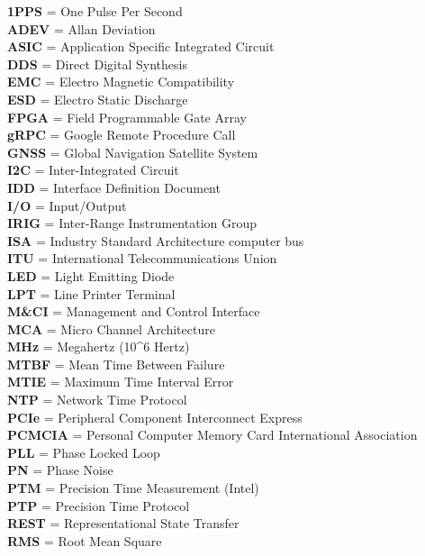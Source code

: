 \documentclass[
]{article}
\begin{document}
\textbf{1PPS} = One Pulse Per Second\\
\textbf{ADEV} = Allan Deviation\\
\textbf{ASIC} = Application Specific Integrated Circuit\\
\textbf{DDS} = Direct Digital Synthesis\\
\textbf{EMC} = Electro Magnetic Compatibility\\
\textbf{ESD} = Electro Static Discharge\\
\textbf{FPGA} = Field Programmable Gate Array\\
\textbf{gRPC} = Google Remote Procedure Call\\
\textbf{GNSS} = Global Navigation Satellite System\\
\textbf{I2C} = Inter-Integrated Circuit\\
\textbf{IDD} = Interface Definition Document\\
\textbf{I/O} = Input/Output\\
\textbf{IRIG} = Inter-Range Instrumentation Group\\
\textbf{ISA} = Industry Standard Architecture computer bus\\
\textbf{ITU} = International Telecommunications Union\\
\textbf{LED} = Light Emitting Diode\\
\textbf{LPT} = Line Printer Terminal\\
\textbf{M\&CI} = Management and Control Interface\\
\textbf{MCA} = Micro Channel Architecture\\
\textbf{MHz} = Megahertz (10\^{}6 Hertz)\\
\textbf{MTBF} = Mean Time Between Failure\\
\textbf{MTIE} = Maximum Time Interval Error\\
\textbf{NTP} = Network Time Protocol\\
\textbf{PCIe} = Peripheral Component Interconnect Express\\
\textbf{PCMCIA} = Personal Computer Memory Card International
Association\\
\textbf{PLL} = Phase Locked Loop\\
\textbf{PN} = Phase Noise\\
\textbf{PTM} = Precision Time Measurement (Intel)\\
\textbf{PTP} = Precision Time Protocol\\
\textbf{REST} = Representational State Transfer\\
\textbf{RMS} = Root Mean Square\\
\end{document}
